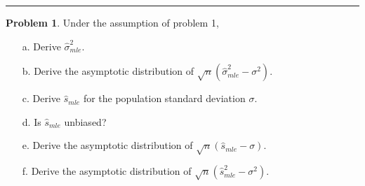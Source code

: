 \documentclass[a4paper, 10pt]{article}
\theoremstyle{definition}
\newtheorem{problem}{Problem}
\theoremstyle{hSol}
\begin{document}
\noindent\rule{16cm}{0.4pt}

\begin{problem} Under the assumption of problem 1,
\begin{itemize}
  \item[a.] Derive $\hat{\sigma}^2_{mle}$.
  \item[b.] Derive the asymptotic distribution of $\sqrt{n}(\hat{\sigma}^2_{mle}-\sigma^2)$.
  \item[c.] Derive $\hat{s}_{mle}$ for the population standard deviation $\sigma$.
  \item[d.] Is $\hat{s}_{mle}$ unbiased?
  \item[e.] Derive the asymptotic distribution of $\sqrt{n}(\hat{s}_{mle}-\sigma)$.
  \item[f.] Derive the asymptotic distribution of $\sqrt{n}(\hat{s}_{mle}^2 - \sigma^2)$.
\end{itemize}
\end{problem}
\end{document}

